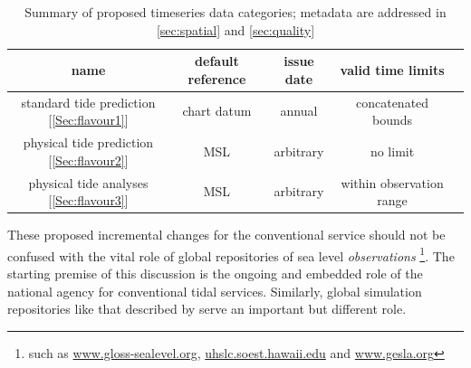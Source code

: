 \begin{table}[H]\centering
    \begin{tabular}{ |c|c|c|c|c| }
    \hline
    name    & 
        default reference  & 
        issue date         & 
        valid time limits  \\
    \hline
    standard tide prediction [\ref{Sec:flavour1}] & 
        chart datum & annual & 
        concatenated bounds\\
    \hline
    physical tide prediction [\ref{Sec:flavour2}]& 
        MSL       & 
        arbitrary & 
        no limit \\
    \hline
    physical tide analyses [\ref{Sec:flavour3}]& 
        MSL       & 
        arbitrary & 
        within observation range \\
    \hline
    \end{tabular}
    \caption{Summary of proposed timeseries data categories; metadata are addressed in \ref{sec:spatial} and \ref{sec:quality} }
    \label{tab:typesSummary}
\end{table}
These proposed incremental changes for the conventional service should not be confused with the vital role of global repositories of sea level \textit{observations} \footnote{such as \url{www.gloss-sealevel.org}, \url{uhslc.soest.hawaii.edu} and \url{www.gesla.org}}.    The starting premise of this discussion is the ongoing and embedded role of the national agency for conventional tidal services.    
Similarly, global simulation repositories like that described by \citeauthor{10.3389/fmars.2020.00263}
serve an important but different role.

